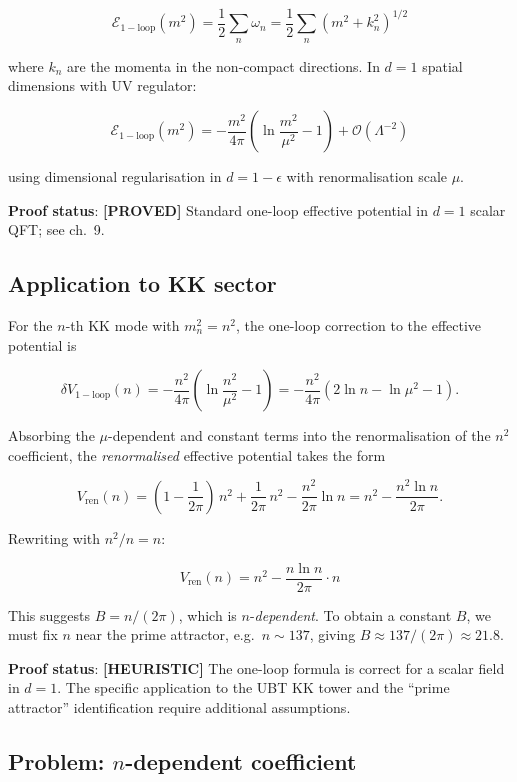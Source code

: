 \documentclass[11pt,a4paper]{article}
\newcommand{\proved}[1]{\textbf{[PROVED]} #1}
\newcommand{\heuristic}[1]{\textbf{[HEURISTIC]} #1}
\begin{document}
\[
  \mathcal{E}_\mathrm{1-loop}(m^2) = \frac{1}{2}\sum_{n} \omega_n
  = \frac{1}{2}\sum_{n} (m^2 + k_n^2)^{1/2}
\]

where $k_n$ are the momenta in the non-compact directions.  In $d=1$ spatial
dimensions with UV regulator:

\[
  \mathcal{E}_\mathrm{1-loop}(m^2)
  = -\frac{m^2}{4\pi}\left(\ln\frac{m^2}{\mu^2} - 1\right)
  + \mathcal{O}(\Lambda^{-2})
\]

using dimensional regularisation in $d = 1 - \epsilon$ with renormalisation
scale $\mu$.

\textbf{Proof status}: \proved{Standard one-loop effective potential in
$d=1$ scalar QFT; see \cite{ZinnJustin} ch.\ 9.}

\subsection{Application to KK sector}

For the $n$-th KK mode with $m_n^2 = n^2$, the one-loop correction to the
effective potential is

\[
  \delta V_\mathrm{1-loop}(n)
  = -\frac{n^2}{4\pi}\left(\ln\frac{n^2}{\mu^2} - 1\right)
  = -\frac{n^2}{4\pi}\left(2\ln n - \ln\mu^2 - 1\right).
\]

Absorbing the $\mu$-dependent and constant terms into the renormalisation of the
$n^2$ coefficient, the \emph{renormalised} effective potential takes the form

\[
  V_\mathrm{ren}(n)
  = (1 - \frac{1}{2\pi})\, n^2 + \frac{1}{2\pi}\, n^2 - \frac{n^2}{2\pi}\ln n
  = n^2 - \frac{n^2\ln n}{2\pi}.
\]

Rewriting with $n^2/n = n$:

\[
  \boxed{V_\mathrm{ren}(n) = n^2 - \frac{n\ln n}{2\pi}\cdot n}
\]

This suggests $B = n/(2\pi)$, which is $n$-\emph{dependent}.  To obtain a
constant $B$, we must fix $n$ near the prime attractor, e.g.\ $n \sim 137$,
giving $B \approx 137/(2\pi) \approx 21.8$.

\textbf{Proof status}: \heuristic{The one-loop formula is correct for a scalar
field in $d=1$.  The specific application to the UBT KK tower and the
``prime attractor'' identification require additional assumptions.}

\subsection{Problem: $n$-dependent coefficient}
\end{document}
